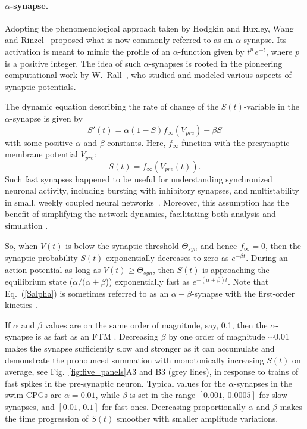 \documentclass[nofootinbib,aip,amsmath,amssymb,reprint,twocolumn,10pt]{revtex4-2}
\begin{document}
\paragraph{$\alpha$-synapse.} Adopting the phenomenological approach taken by Hodgkin and Huxley, Wang and Rinzel~\cite{Wang-Rinzel-92} proposed what is now commonly referred to as an $\alpha$-synapse. Its activation is meant to mimic the profile of an $\alpha$-function given by $t^p\, e^{-t}$, where $p$ is a positive integer. The idea of such $\alpha$-synapses is rooted in the pioneering computational work by W.~Rall~\cite{Rall67}, who studied and modeled various aspects of synaptic potentials.
 
The dynamic equation describing the rate of change of the $S(t)$-variable in the $\alpha$-synapse is given by
\begin{equation}
S'(t) = \alpha (1-S) f_{\infty}(V_{pre}) - \beta S \label{Salpha}
\end{equation}
with some positive  $\alpha$ and $\beta$ constants. Here, $f_{\infty}$ function with the presynaptic membrane potential $V_{pre}$: 
\begin{equation}
S(t) = f_{\infty}(V_{pre}(t)). \label{ftm}
\end{equation}
 Such fast synapses happened to be useful for understanding synchronized neuronal activity, including bursting with inhibitory synapses, and multistability in small, weekly coupled neural networks~\cite{prl08, Shilnikov2008b, Jalil-Belykh-Shilnikov-10, Wojcik2011a,  Wojcik2014, schwabedal2016qualitative,kelley20202,collens2020dynamics, pusuluri2020computational}. Moreover, this assumption has the benefit of simplifying the network dynamics, facilitating both analysis and simulation \cite{jalil2013,Schwabedal-Neiman-Shilnikov-14,lodi2019design}. 


So, when $V(t)$ is below the synaptic threshold $\Theta_{syn}$ and hence $f_{\infty}=0$, then the synaptic probability $S(t)$ exponentially decreases to zero as $e^{-\beta t}$. During an action potential as long as $V(t) \ge \Theta_{syn}$, then $S(t)$  is approaching the equilibrium state ($\alpha/(\alpha+\beta$)) exponentially fast as $e^{-(\alpha+\beta)t}$. Note that Eq.~(\ref{Salpha}) is sometimes referred to as an $\alpha-\beta$-synapse with the first-order kinetics \cite{destexhe1994synthesis}.

If $\alpha$ and $\beta$ values are on the same order of magnitude, say, 0.1, then the $\alpha$-synapse is as fast as an FTM \cite{Alacam2015,Jalil-Belykh-Shilnikov-12,baruzzi2021towards, baruzzi2020generalized}. Decreasing $\beta$ by one order of magnitude $\sim 0.01$ makes the synapse sufficiently slow and stronger as it can accumulate and demonstrate the pronounced summation with monotonically increasing $S(t)$ on average, see Fig.~\ref{fig:five_panels}A3 and B3 (grey lines), in response to trains of fast spikes in the pre-synaptic neuron. Typical values for the $\alpha$-synapses in the swim CPGs are $\alpha = 0.01$, while $\beta$ is set in the range $\left[0.001,\, 0.0005\right]$ for slow synapses, and $\left[0.01,\, 0.1\right]$ for fast ones. Decreasing proportionally $\alpha$ and $\beta$ makes the time progression of $S(t)$ smoother with smaller amplitude variations.      
\end{document}
